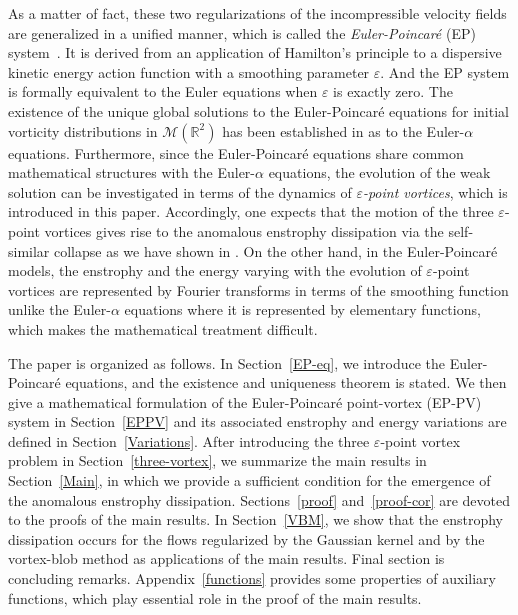 \documentclass{article}
\theoremstyle{definition}
\begin{document}
As a matter of fact, these two regularizations of the incompressible velocity fields are generalized in a unified manner, which is called the \textit{Euler-Poincar\'{e}} (EP) 
system~\cite{Holm(a), Holm(b)}. It is derived from an application of Hamilton's principle to a dispersive kinetic energy  action function with a
 smoothing parameter $\varepsilon$. And the EP system is formally equivalent to the Euler equations when $\varepsilon$ is exactly zero.
The existence of the unique global solutions to the Euler-Poincar\'{e} equations for initial vorticity distributions in $\mathcal{M}(\mathbb{R}^2)$ has been established in \cite{G.3} 
as to the Euler-$\alpha$ equations. Furthermore, since the Euler-Poincar\'{e} equations share common mathematical structures with the Euler-$\alpha$ equations, 
the evolution of the weak solution can be investigated in terms of the dynamics of \textit{$\varepsilon$-point vortices}, which is introduced in this paper.
 Accordingly, one expects that the motion of the 
three $\varepsilon$-point vortices gives rise to the anomalous enstrophy dissipation via the self-similar collapse as we have shown in \cite{G.2}. On the other hand, in the 
Euler-Poincar\'{e} models, the enstrophy and the energy varying with the evolution of $\varepsilon$-point vortices are represented by Fourier transforms in terms of the smoothing 
function unlike the Euler-$\alpha$  equations where it is represented by elementary functions, which makes the mathematical treatment difficult.

 The paper is organized as follows. In Section~\ref{EP-eq}, we introduce the Euler-Poincar\'{e} equations,  and the existence and uniqueness theorem is stated. 
 We then give a mathematical formulation of the Euler-Poincar\'{e} point-vortex  (EP-PV) system in Section~\ref{EPPV} and its associated  enstrophy and energy variations 
  are defined in  Section~\ref{Variations}. After introducing the three $\varepsilon$-point vortex problem  in Section~\ref{three-vortex},  we summarize the main results in Section~\ref{Main},
  in which we provide a sufficient condition  for the emergence of the anomalous enstrophy dissipation. Sections~\ref{proof} and~\ref{proof-cor} are devoted to the proofs of the main results.  In Section~\ref{VBM}, we show that the enstrophy dissipation occurs for the flows regularized by the Gaussian kernel and by the vortex-blob method as applications of the main results.  Final section is concluding remarks. Appendix~\ref{functions} provides some properties of auxiliary functions, which play essential role in the proof of the main results.  
\end{document}
